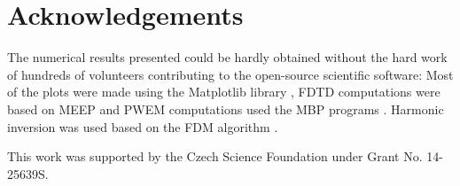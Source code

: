
\thispagestyle{empty} \newpage
\chapter*{Acknowledgements}
\todo{+}

The numerical results presented could be hardly obtained without the hard work of hundreds of volunteers contributing to the open-source scientific software: Most of the plots were made using the Matplotlib library \cite{hunter2007}, FDTD computations were based on MEEP \cite{oskooi2010meep} and PWEM computations used the MBP programs \cite{johnson2001mpb}. Harmonic inversion was used based on the FDM algorithm \cite{mandelshtam1997harmonic}.

This work was supported by the Czech Science Foundation under Grant No. 14-25639S.


\thispagestyle{empty} \newpage
